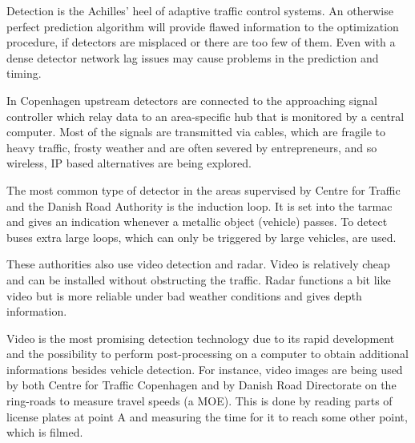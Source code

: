 \label{detection}
Detection is the Achilles' heel of adaptive traffic control systems. An otherwise perfect prediction algorithm will provide flawed information to the optimization procedure, if detectors are misplaced or there are too few of them. Even with a dense detector network lag issues may cause problems in the prediction and timing.

In Copenhagen upstream detectors are connected to the approaching signal controller which relay data to an area-specific hub that is monitored by a central computer. Most of the signals are transmitted via cables, which are fragile to heavy traffic, frosty weather and are often severed by entrepreneurs, and so wireless, IP based alternatives are being explored.

The most common type of detector in the areas supervised by Centre for Traffic and the Danish Road Authority is the induction loop. It is set into the tarmac and gives an indication whenever a metallic object (vehicle) passes. To detect buses extra large loops, which can only be triggered by large vehicles, are used. 

These authorities also use video detection and radar. Video is relatively cheap and can be installed without obstructing the traffic. Radar functions a bit like video but is more reliable under bad weather conditions and gives depth information.

Video is the most promising detection technology due to its rapid development and the possibility to perform post-processing on a computer to obtain additional informations besides vehicle detection. For instance, video images are being used by both Centre for Traffic Copenhagen and by Danish Road Directorate on the ring-roads to measure travel speeds (a MOE). This is done by reading parts of license plates at point A and measuring the time for it to reach some other point, which is filmed.